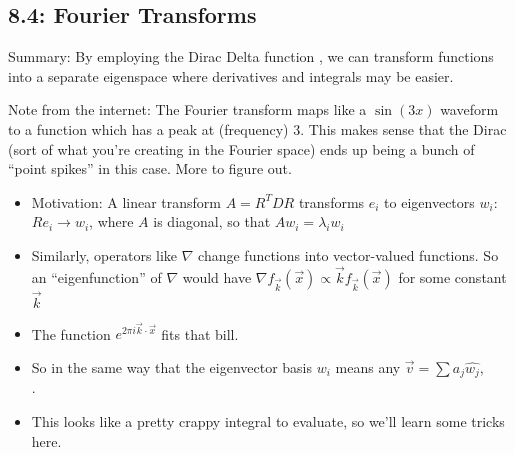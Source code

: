\documentclass[11pt, oneside]{article}   	%
\begin{document}
\subsection{8.4: Fourier Transforms}

Summary: By employing the Dirac Delta function , we can transform functions into a separate eigenspace where derivatives and integrals may be easier.

Note from the internet: The Fourier transform maps like a $\sin(3x)$ waveform to a function which has a peak at (frequency) $3$.  This makes sense that the Dirac (sort of what you're creating in the Fourier space) ends up being a bunch of ``point spikes'' in this case.  More to figure out.

\begin{itemize}
\item Motivation: A linear transform $A = R^TDR$ transforms $e_i$ to eigenvectors $w_i$: $Re_i \rightarrow w_i$, where $A$ is diagonal, so that $Aw_i = \lambda_iw_i$
\item Similarly, operators like $\nabla$ change functions into vector-valued functions.  So an ``eigenfunction'' of $\nabla$ would have $\nabla f_{\vec{k}}(\vec{x}) \propto  \vec{k}  f_{\vec{k}}(\vec{x})  $ for some constant $\vec{k}$
\item The function $e^{2\pi i \vec{k} \cdot \vec{x}}$ fits that bill.
\item So in the same way that the eigenvector basis $w_i$ means any $\vec{v} = \sum a_j \hat{w_j}$,
\\
 .
 \item This looks like a pretty crappy integral to evaluate, so we'll learn some tricks here.
\end{itemize}
\end{document}
